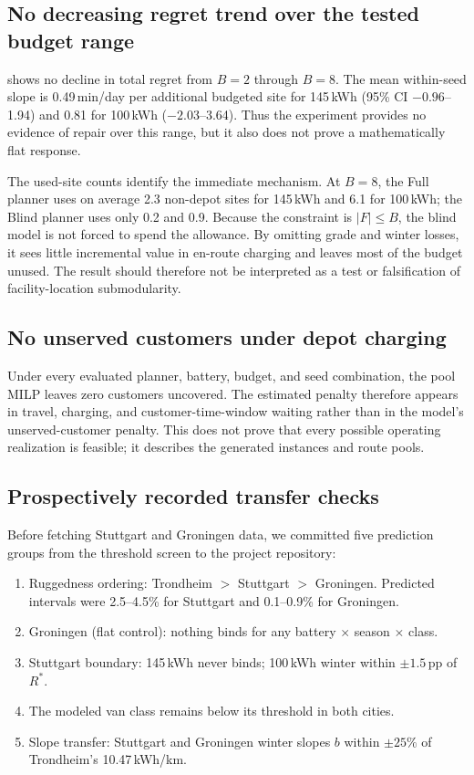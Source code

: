 \documentclass[review,3p,authoryear]{elsarticle}
\newcommand{\Rstar}{R^{*}}
\begin{document}
\subsection{No decreasing regret trend over the tested budget range}
\label{sec:plateau}

 shows no decline in total regret from $B=2$ through
$B=8$.  The mean within-seed slope is 0.49\,min/day per additional
budgeted site for 145\,kWh (95\% CI $-0.96$--1.94) and 0.81 for
100\,kWh ($-2.03$--3.64).  Thus the experiment provides no evidence of
repair over this range, but it also does not prove a mathematically flat
response.

The used-site counts identify the immediate mechanism.  At $B=8$, the
Full planner uses on average 2.3 non-depot sites for 145\,kWh and 6.1 for
100\,kWh; the Blind planner uses only 0.2 and 0.9.  Because the constraint
is $|F|\le B$, the blind model is not forced to spend the allowance.  By
omitting grade and winter losses, it sees little incremental value in
en-route charging and leaves most of the budget unused.  The result should
therefore not be interpreted as a test or falsification of facility-location
submodularity.

\subsection{No unserved customers under depot charging}
\label{sec:stranded}

Under every evaluated planner, battery, budget, and seed combination, the
pool MILP leaves zero customers uncovered.  The estimated penalty therefore
appears in travel, charging, and customer-time-window waiting rather than in
the model's unserved-customer penalty.  This does not prove that every
possible operating realization is feasible; it describes the generated
instances and route pools.

\subsection{Prospectively recorded transfer checks}
\label{sec:predictions}

Before fetching Stuttgart and Groningen data, we committed five prediction
groups from the threshold screen to the project repository:

\begin{enumerate}[label=P\arabic*.]
  \item Ruggedness ordering: Trondheim $>$ Stuttgart $>$ Groningen.
    Predicted intervals were 2.5--4.5\% for Stuttgart and 0.1--0.9\%
    for Groningen.
  \item Groningen (flat control): nothing binds for any battery $\times$ season $\times$ class.
  \item Stuttgart boundary: 145\,kWh never binds; 100\,kWh winter within $\pm 1.5$\,pp of $\Rstar$.
  \item The modeled van class remains below its threshold in both cities.
  \item Slope transfer: Stuttgart and Groningen winter slopes $b$ within $\pm 25\%$ of Trondheim's 10.47\,kWh/km.
\end{enumerate}
\end{document}
